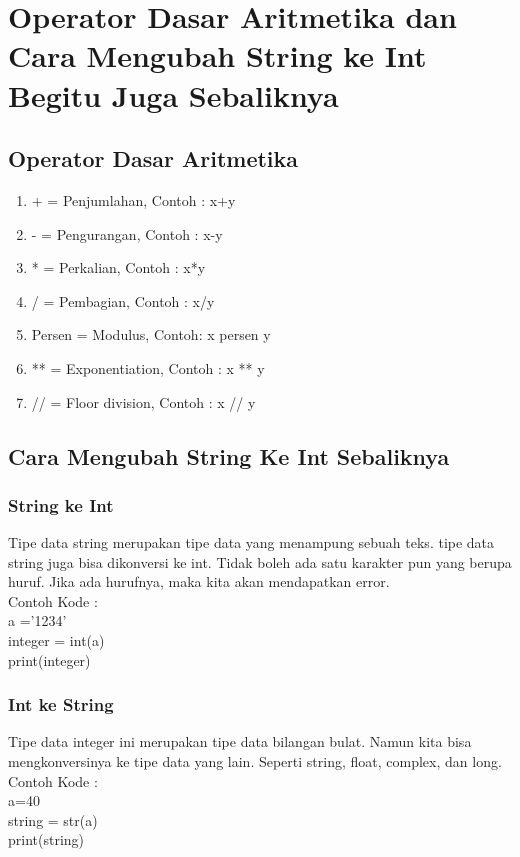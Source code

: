 \section{Operator Dasar Aritmetika dan Cara Mengubah String ke Int Begitu Juga Sebaliknya}
\subsection{Operator Dasar Aritmetika}
\begin{enumerate}
\item + = Penjumlahan, Contoh : x+y\\
\item - = Pengurangan, Contoh : x-y\\
\item * = Perkalian, Contoh : x*y\\
\item / = Pembagian, Contoh : x/y\\
\item Persen = Modulus, Contoh:	x persen y\\
\item ** = Exponentiation, Contoh :	x ** y\\
\item // = Floor division, Contoh :	x // y\\
\end{enumerate}
\subsection{Cara Mengubah String Ke Int Sebaliknya}
\subsubsection{String ke Int}
Tipe data string merupakan tipe data yang menampung sebuah teks. tipe data string juga bisa dikonversi ke int. Tidak boleh ada satu karakter pun yang berupa huruf. Jika ada hurufnya, maka kita akan mendapatkan error. \\
Contoh Kode :\\
a ='1234' \\
integer = int(a)\\
print(integer)\\

\subsubsection{Int ke String}
Tipe data integer ini merupakan tipe data bilangan bulat. Namun kita bisa mengkonversinya ke tipe data yang lain. Seperti string, float, complex, dan long.\\ Contoh Kode :\\
a=40\\
string = str(a)\\
print(string)\\

